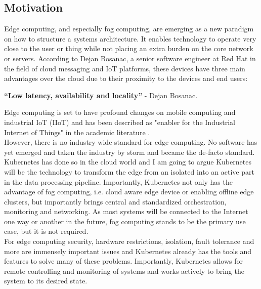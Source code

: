\subsection{Motivation}
Edge computing, and especially fog computing, are emerging as a new paradigm on how to structure a systems architecture. It enables technology to operate very close to the user or thing while not placing an extra burden on the core network or servers. According to Dejan Bosanac, a senior software engineer at Red Hat in the field of cloud messaging and IoT platforms, these devices have three main advantages over the cloud due to their proximity to the devices and end users: 
\begin{displayquote}
{\textbf{``Low latency, availability and locality''}}\cite{IntroducingDejanBosanac:KubernetesIoTEdgeWorkingGroup} - Dejan Bosanac.
\end{displayquote} 
Edge computing is set to have profound changes on mobile computing and industrial IoT (IIoT) and has been described as "enabler for the Industrial Internet of Things"\cite{steiner2016fogenablerIIoT} in the academic literature .\\
However, there is no industry wide standard for edge computing. No software has yet emerged and taken the industry by storm and became the de-facto standard. Kubernetes has done so in the cloud world and I am going to argue Kubernetes will be the technology to transform the edge from an isolated into an active part in the data processing pipeline. Importantly, Kubernetes not only has the advantage of fog computing, i.e. cloud aware edge device or enabling offline edge clusters, but importantly brings central and standardized orchestration, monitoring and networking. As most systems will be connected to the Internet one way or another in the future, fog computing stands to be the primary use case, but it is not required.\\
For edge computing security, hardware restrictions, isolation, fault tolerance and more are immensely important issues and Kubernetes already has the tools and features to solve many of these problems. Importantly, Kubernetes allows for remote controlling and monitoring of systems and works actively  to bring the system to its desired state.\\


